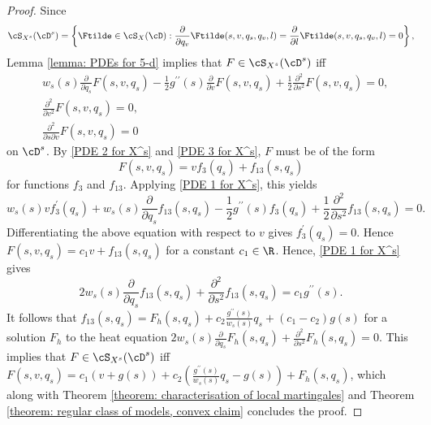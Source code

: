 \documentclass[11pt]{article}
\begin{document}
\begin{proof}

Since 
$$
\cS_{X^s}(\cD^s) = \left\{ \Ftilde \in \cS_X(\cD) : \frac{\partial}{\partial q_v} \Ftilde(s, v, q_s, q_v, l) = \frac{\partial}{\partial l} \Ftilde(s, v, q_s, q_v, l) = 0 \right\},
$$
Lemma \ref{lemma: PDEs for 5-d} implies that $F \in \cS_{X^s}(\cD^s)$ iff
\begin{align}
&w_s(s) \frac{\partial}{\partial q_s} F(s, v, q_s) - \frac{1}{2} g^{\prime\prime}(s) \frac{\partial}{\partial v} F(s, v, q_s) + \frac{1}{2} \frac{\partial^2}{\partial s^2} F(s, v, q_s) = 0, \label{PDE 1 for X^s} \\
%
%
%
&\frac{\partial^2}{\partial v^2} F(s, v, q_s) = 0, \label{PDE 2 for X^s} \\
%
%
%
&\frac{\partial^2}{\partial s \partial v} F(s, v, q_s) = 0 \label{PDE 3 for X^s}
\end{align}
on $\cD^s$. By \eqref{PDE 2 for X^s} and \eqref{PDE 3 for X^s}, $F$ must be of the form
$$
F(s, v, q_s) = v f_3(q_s) + f_{13}(s, q_s)
$$
for functions $f_3$ and $f_{13}$. Applying \eqref{PDE 1 for X^s}, this yields
\begin{equation}
\label{X^s proof intermediate equation}
w_s(s) v f_3^\prime(q_s) + w_s(s) \frac{\partial}{\partial q_s} f_{13}(s, q_s) - \frac{1}{2} g^{\prime\prime}(s) f_3(q_s) + \frac{1}{2} \frac{\partial^2}{\partial s^2} f_{13}(s, q_s) = 0.
\end{equation}
Differentiating the above equation with respect to $v$ gives $f_3^\prime (q_s) = 0$. Hence $F(s, v, q_s) = c_1 v + f_{13}(s, q_s)$ for a constant $c_1 \in \R$. Hence, \eqref{PDE 1 for X^s} gives
$$
2 w_s(s) \frac{\partial}{\partial q_s} f_{13}(s, q_s) + \frac{\partial^2}{\partial s^2} f_{13} (s, q_s) =  c_1 g^{\prime\prime}(s).
$$
It follows that $f_{13}(s, q_s) = F_h(s, q_s) + c_2 \frac{g^{\prime\prime}(s)}{w_s(s)} q_s + (c_1 - c_2) g(s)$ for a solution $F_h$ to the heat equation $2 w_s(s) \frac{\partial}{\partial q_s} F_h(s, q_s) + \frac{\partial^2}{\partial s^2} F_h(s, q_s) = 0$. This implies that $F \in \cS_{X^s}(\cD^s)$ iff $F(s, v, q_s) = c_1(v + g(s)) + c_2 \left( \frac{g^{\prime\prime}(s)}{w_s(s)} q_s - g(s) \right) + F_h(s,q_s)$, which along with Theorem \ref{theorem: characterisation of local martingales} and Theorem \ref{theorem: regular class of models, convex claim} concludes the proof.

\end{proof}
\end{document}
